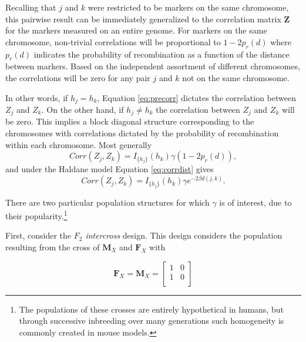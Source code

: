\documentclass{article}
\newcommand{\ve}[1]{\mathbf{#1}}           %
\newcommand{\m}[1]{\mathbf{#1}}               %
\newcommand{\ind}[2]{I_{#2} \left( #1 \right)}
\begin{document}

Recalling that $j$ and $k$ were restricted to be markers on the same chromosome, this pairwise result can be immediately generalized to the correlation matrix $\ve{Z}$ for the markers measured on an entire genome. For markers on the same chromosome, non-trivial correlations will be proportional to $1 - 2p_r(d)$ where $p_r(d)$ indicates the probability of recombination as a function of the distance between markers. Based on the independent assortment of different chromosomes, the correlations will be zero for any pair $j$ and $k$ not on the same chromosome.

In other words, if $h_j = h_k$, Equation \ref{eq:precorr} dictates the correlation between $Z_j$ and $Z_k$. On the other hand, if $h_j \neq h_k$ the correlation between $Z_j$ and $Z_k$ will be zero. This implies a block diagonal structure corresponding to the chromosomes with correlations dictated by the probability of recombination within each chromosome. Most generally
\begin{equation} \label{eq:zcorr_gen}
  Corr(Z_j, Z_k) = \ind{h_k}{\{h_j\}} \gamma (1 - 2p_r(d)),
\end{equation}
and under the Haldane model Equation \ref{eq:corrdist} gives
\begin{equation} \label{eq:zcorr}
  Corr(Z_j, Z_k) = \ind{h_k}{\{h_j\}} \gamma e^{-2 \beta d(j,k)}.
\end{equation}

\noindent There are two particular population structures for which $\gamma$ is of interest, due to their popularity.\footnote{The populations of these crosses are entirely hypothetical in humans, but through successive inbreeding over many generations such homogeneity is commonly created in mouse models.}

First, consider the \textit{$F_2$ intercross} design. This design considers the population resulting from the cross of $\m{M}_X$ and $\m{F}_X$ with

$$\m{F}_X = \m{M}_X = \begin{bmatrix}
  1 & 0 \\
  1 & 0 \\
\end{bmatrix}$$
\end{document}
